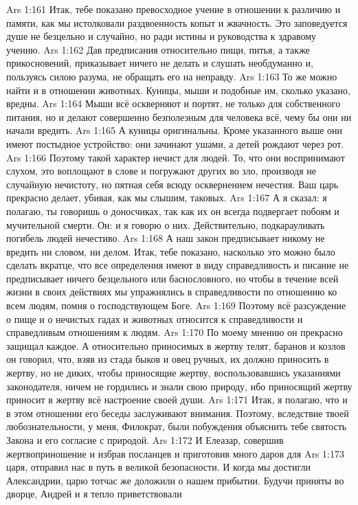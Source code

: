 \vs Ars 1:161
Итак, тебе показано превосходное учение в отношении к различию и памяти, как мы истолковали раздвоенность копыт и жвачность. Это заповедуется душе не безцельно и случайно, но ради истины и руководства к здравому учению.
\vs Ars 1:162
Дав предписания относительно пищи, питья, а также прикосновений, приказывает ничего не делать и слушать необдуманно и, пользуясь силою разума, не обращать его на неправду.
\vs Ars 1:163
То же можно найти и в отношении животных. Куницы, мыши и подобные им, сколько указано, вредны.
\vs Ars 1:164
Мыши всё оскверняют и портят, не только для собственного питания, но и делают совершенно безполезным для человека всё, чему бы они ни начали вредить.
\vs Ars 1:165
А куницы оригинальны. Кроме указанного выше они имеют постыдное устройство: они зачинают ушами, а детей рождают через рот.
\vs Ars 1:166
Поэтому такой характер нечист для людей. То, что они воспринимают слухом, это воплощают в слове и погружают других во зло, производя не случайную нечистоту, но пятная себя всюду осквернением нечестия. Ваш царь прекрасно делает, убивая, как мы слышим, таковых.
\vs Ars 1:167
А я сказал: я полагаю, ты говоришь о доносчиках, так как их он всегда подвергает побоям и мучительной смерти.
Он: и я говорю о них. Действительно, подкарауливать погибель людей нечестиво.
\vs Ars 1:168
А наш закон предписывает никому не вредить ни словом, ни делом.
Итак, тебе показано, насколько это можно было сделать вкратце, что все определения имеют в виду справедливость и писание не предписывает ничего безцельного или баснословного, но чтобы в течение всей жизни в своих действиях мы упражнялись в справедливости по отношению ко всем людям, помня о господствующем Боге.
\vs Ars 1:169
Поэтому всё разсуждение о пище и о нечистых гадах и животных относится к справедливости и справедливым отношениям к людям.
\vs Ars 1:170
По моему мнению он прекрасно защищал каждое. А относительно приносимых в жертву телят, баранов и козлов он говорил, что, взяв из стада быков и овец ручных, их должно приносить в жертву, но не диких, чтобы приносящие жертву, воспользовавшись указаниями законодателя, ничем не гордились и знали свою природу, ибо приносящий жертву приносит в жертву всё настроение своей души.
\vs Ars 1:171
Итак, я полагаю, что и в этом отношении его беседы заслуживают внимания. Поэтому, вследствие твоей любознательности, у меня, Филократ, были побуждения объяснить тебе святость Закона и его согласие с природой.
\vs Ars 1:172
И Елеазар, совершив жертвоприношение и избрав посланцев и приготовив много даров для
\vs Ars 1:173
царя, отправил нас в путь в великой безопасности. И когда мы достигли Александрии, царю тотчас же доложили о нашем прибытии. Будучи приняты во дворце, Андрей и я тепло приветствовали
